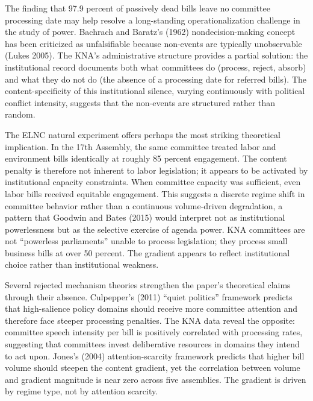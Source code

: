 \documentclass[11pt]{article}
\begin{document}
The finding that 97.9 percent of passively dead bills leave no committee processing date may help resolve a long-standing operationalization challenge in the study of power. Bachrach and Baratz's (1962) nondecision-making concept has been criticized as unfalsifiable because non-events are typically unobservable (Lukes 2005). The KNA's administrative structure provides a partial solution: the institutional record documents both what committees do (process, reject, absorb) and what they do not do (the absence of a processing date for referred bills). The content-specificity of this institutional silence, varying continuously with political conflict intensity, suggests that the non-events are structured rather than random.

The ELNC natural experiment offers perhaps the most striking theoretical implication. In the 17th Assembly, the same committee treated labor and environment bills identically at roughly 85 percent engagement. The content penalty is therefore not inherent to labor legislation; it appears to be activated by institutional capacity constraints. When committee capacity was sufficient, even labor bills received equitable engagement. This suggests a discrete regime shift in committee behavior rather than a continuous volume-driven degradation, a pattern that Goodwin and Bates (2015) would interpret not as institutional powerlessness but as the selective exercise of agenda power. KNA committees are not ``powerless parliaments'' unable to process legislation; they process small business bills at over 50 percent. The gradient appears to reflect institutional choice rather than institutional weakness.

Several rejected mechanism theories strengthen the paper's theoretical claims through their absence. Culpepper's (2011) ``quiet politics'' framework predicts that high-salience policy domains should receive more committee attention and therefore face steeper processing penalties. The KNA data reveal the opposite: committee speech intensity per bill is positively correlated with processing rates, suggesting that committees invest deliberative resources in domains they intend to act upon. Jones's (2004) attention-scarcity framework predicts that higher bill volume should steepen the content gradient, yet the correlation between volume and gradient magnitude is near zero across five assemblies. The gradient is driven by regime type, not by attention scarcity.
\end{document}
